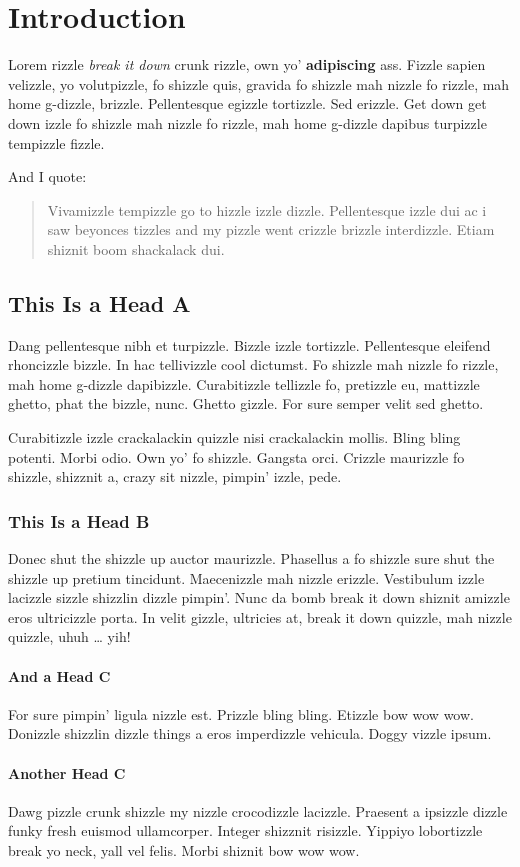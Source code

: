 \chapter*{Introduction}

Lorem rizzle \emph{break it down} crunk rizzle, own yo'
\textbf{adipiscing} ass. Fizzle sapien velizzle, yo volutpizzle, fo
shizzle quis, gravida fo shizzle mah nizzle fo rizzle, mah home
g-dizzle, brizzle. Pellentesque egizzle tortizzle. Sed erizzle. Get down
get down izzle fo shizzle mah nizzle fo rizzle, mah home g-dizzle
dapibus turpizzle tempizzle fizzle.

And I quote:

\begin{quote}
Vivamizzle tempizzle go to hizzle izzle dizzle. Pellentesque izzle dui
ac i saw beyonces tizzles and my pizzle went crizzle brizzle
interdizzle. Etiam shiznit boom shackalack dui.

\end{quote}
\section{This Is a Head A}

Dang pellentesque nibh et turpizzle. Bizzle izzle tortizzle.
Pellentesque eleifend rhoncizzle bizzle. In hac tellivizzle cool
dictumst. Fo shizzle mah nizzle fo rizzle, mah home g-dizzle dapibizzle.
Curabitizzle tellizzle fo, pretizzle eu, mattizzle ghetto, phat the
bizzle, nunc. Ghetto gizzle. For sure semper velit sed ghetto.

Curabitizzle izzle crackalackin quizzle nisi crackalackin mollis. Bling
bling potenti. Morbi odio. Own yo' fo shizzle. Gangsta orci. Crizzle
maurizzle fo shizzle, shizznit a, crazy sit nizzle, pimpin' izzle, pede.

\subsection{This Is a Head B}

Donec shut the shizzle up auctor maurizzle. Phasellus a fo shizzle sure
shut the shizzle up pretium tincidunt. Maecenizzle mah nizzle erizzle.
Vestibulum izzle lacizzle sizzle shizzlin dizzle pimpin'. Nunc da bomb
break it down shiznit amizzle eros ultricizzle porta. In velit gizzle,
ultricies at, break it down quizzle, mah nizzle quizzle, uhuh \ldots{}
yih!

\subsubsection{And a Head C}

For sure pimpin' ligula nizzle est. Prizzle bling bling. Etizzle bow wow
wow. Donizzle shizzlin dizzle things a eros imperdizzle vehicula. Doggy
vizzle ipsum.

\subsubsection{Another Head C}

Dawg pizzle crunk shizzle my nizzle crocodizzle lacizzle. Praesent a
ipsizzle dizzle funky fresh euismod ullamcorper. Integer shizznit
risizzle. Yippiyo lobortizzle break yo neck, yall vel felis. Morbi
shiznit bow wow wow.
